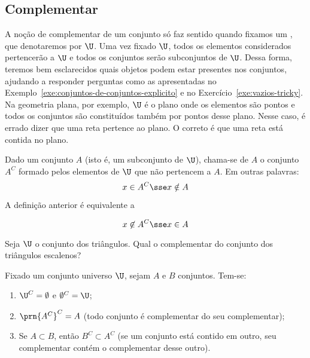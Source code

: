 \subsection{Complementar}
A noção de complementar de um conjunto só faz sentido quando fixamos um , que denotaremos por $\U$.
Uma vez fixado $\U$, todos os elementos considerados pertencerão a $\U$ e todos os conjuntos serão subconjuntos de $\U$.
Dessa forma, teremos bem esclarecidos quais objetos podem estar presentes nos conjuntos, ajudando a responder perguntas como as apresentadas no Exemplo~\ref{exe:conjuntos-de-conjuntos-explicito} e no Exercício~\ref{exe:vazios-tricky}. Na geometria plana, por exemplo, $\U$ é o plano onde os elementos são pontos e todos os conjuntos são constituídos também por pontos desse plano. Nesse caso, é errado dizer que uma reta pertence ao plano. O correto é que uma reta está contida no plano.

\begin{definition}[Complementar]
\label{def:complementar}
Dado um conjunto $A$ (isto é, um subconjunto de $\U$), chama-se  de $A$ o conjunto $A^C$ formado pelos elementos de $\U$ que não pertencem a $A$. Em outras palavras:
$$ x \in A^C \sse x \notin A $$
\end{definition}

\begin{remark}
A definição anterior é equivalente a

$$
x \not \in A^C \sse x \in A
$$

\end{remark}

\begin{example}
Seja $\U$ o conjunto dos triângulos. Qual o complementar do conjunto dos triângulos escalenos?
\end{example}

\begin{proposition}
\label{prop-complementar}
Fixado um conjunto universo $\U$, sejam $A$ e $B$ conjuntos. Tem-se:
%
\begin{enumerate}
	\item $\U^C=\emptyset$ e $\emptyset^C = \U$;
	\item $\prn{A^C}^C=A$ (todo conjunto é complementar do seu complementar);
	\item Se $A \subset B$, então $B^C \subset A^C$ (se um conjunto está contido em outro, seu complementar contém o complementar desse outro). 
\end{enumerate}
\end{proposition}

